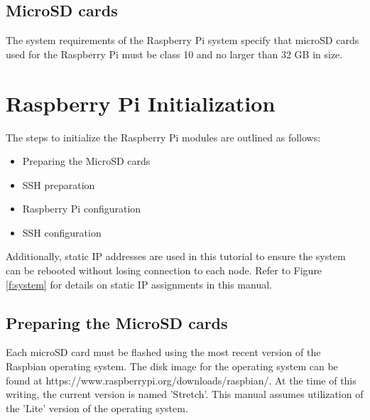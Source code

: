 \documentclass[sigconf]{acmart}
\begin{document}
\subsection{MicroSD cards}
The system requirements of the Raspberry Pi system specify that microSD cards used for the Raspberry Pi must be class 10 and no larger than 32 GB in size.

\section{Raspberry Pi Initialization}
The steps to initialize the Raspberry Pi modules are outlined as follows:
\begin{itemize}
  \setlength{\parskip}{1em}\item Preparing the MicroSD cards
  \setlength{\parskip}{1em}\item SSH preparation
  \setlength{\parskip}{1em}\item Raspberry Pi configuration
  \setlength{\parskip}{1em}\item SSH configuration
\end{itemize}

\setlength{\parskip}{1em}\noindent Additionally, static IP addresses are used in this tutorial to ensure the system can be rebooted without losing connection to each node. Refer to Figure \ref{f:system} for details on static IP assignments in this manual.

\subsection{Preparing the MicroSD cards}
Each microSD card must be flashed using the most recent version of the Raspbian operating system\cite{raspbian2018}. The disk image for the operating system can be found at https://www.raspberrypi.org/downloads/raspbian/. At the time of this writing, the current version is named 'Stretch'. This manual assumes utilization of the 'Lite' version of the operating system.
\end{document}
